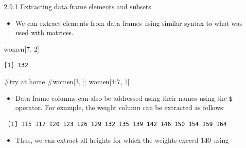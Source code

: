 \documentclass[
  9pt,
  a4paper,
  ignorenonframetext,
  notheorems]{beamer}
\newenvironment{Shaded}{\begin{snugshade}}{\end{snugshade}}
\newcommand{\CommentTok}[1]{\textcolor[rgb]{0.37,0.37,0.37}{#1}}
\newcommand{\DecValTok}[1]{\textcolor[rgb]{0.68,0.00,0.00}{#1}}
\newcommand{\NormalTok}[1]{\textcolor[rgb]{0.00,0.23,0.31}{#1}}
\newcommand{\SpecialCharTok}[1]{\textcolor[rgb]{0.37,0.37,0.37}{#1}}
\providecommand{\tightlist}{%
  \setlength{\itemsep}{0pt}\setlength{\parskip}{0pt}}\usepackage{longtable,booktabs,array}
\begin{document}
\begin{frame}[fragile]
\begin{block}{2.9.1 Extracting data frame elements and subsets}
\protect\hypertarget{extracting-data-frame-elements-and-subsets}{}
\begin{itemize}
\tightlist
\item
  We can extract elements from data frames using similar syntax to what
  was used with matrices.
\end{itemize}

\begin{Shaded}
\begin{Highlighting}[]
\NormalTok{women[}\DecValTok{7}\NormalTok{, }\DecValTok{2}\NormalTok{]}
\end{Highlighting}
\end{Shaded}

\begin{verbatim}
[1] 132
\end{verbatim}

\begin{Shaded}
\begin{Highlighting}[]
\CommentTok{\#try at home}
\CommentTok{\#women[3, ]; women[4:7, 1]}
\end{Highlighting}
\end{Shaded}

\begin{itemize}
\tightlist
\item
  Data frame columns can also be addressed using their names using the
  \texttt{\$} operator. For example, the weight column can be extracted
  as follows:
\end{itemize}

\begin{Shaded}
\end{Shaded}

\begin{verbatim}
 [1] 115 117 120 123 126 129 132 135 139 142 146 150 154 159 164
\end{verbatim}

\begin{itemize}
\tightlist
\item
  Thus, we can extract all heights for which the weights exceed 140
  using
\end{itemize}

\begin{Shaded}
\end{Shaded}


\end{block}
\end{frame}
\end{document}
